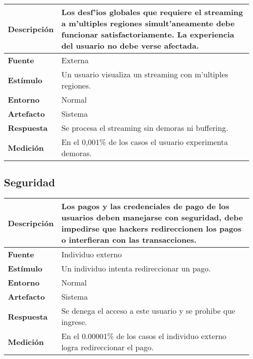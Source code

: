 \begin{center}
  \begin{tabular}{| l | p{10cm} | }
    \hline
  \textbf{Descripción} & Los desf'ios globales que requiere el streaming a m'ultiples regiones simult'aneamente debe funcionar satisfactoriamente. La experiencia del usuario no debe verse afectada.\\  \hline
  \textbf{Fuente} & Externa\\  \hline
  \textbf{Estímulo} & Un usuario visualiza un streaming con m'ultiples regiones.\\  \hline
  \textbf{Entorno} & Normal\\  \hline
  \textbf{Artefacto} & Sistema\\  \hline
  \textbf{Respuesta} & Se procesa el streaming sin demoras ni buffering.\\  \hline
  \textbf{Medición} & En el 0,001\% de los casos el usuario experimenta demoras.\\  \hline
  \end{tabular}
\end{center} 


\subsection{Seguridad}

\begin{center}
  \begin{tabular}{| l | p{10cm} | }
    \hline
  \textbf{Descripción} & Los pagos y las credenciales de pago de los usuarios deben manejarse con seguridad, debe impedirse que hackers redireccionen los pagos o interfieran con las transacciones.\\  \hline
  \textbf{Fuente} & Individuo externo\\  \hline
  \textbf{Estímulo} & Un individuo intenta redireccionar un pago.\\  \hline
  \textbf{Entorno} & Normal\\  \hline
  \textbf{Artefacto} & Sistema\\  \hline
  \textbf{Respuesta} & Se denega el acceso a este usuario y se prohibe que ingrese.\\  \hline
  \textbf{Medición} & En el 0.00001\% de los casos el individuo externo logra redireccionar el pago.\\  \hline
  \end{tabular}
\end{center} 

